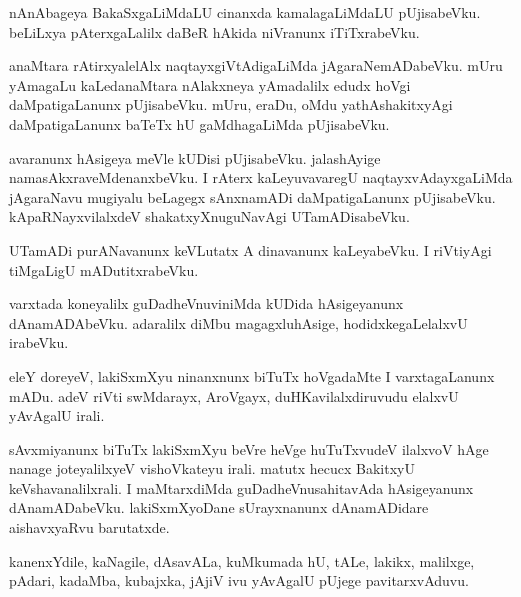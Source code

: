 \documentclass{article}
\begin{document}
\begin{mn}
nAnAbageya  BakaSxgaLiMdaLU  cinanxda  kamalagaLiMdaLU  pUjisabeVku.  beLiLxya  pAterxgaLalilx  
daBeR  hAkida  niVranunx  iTiTxrabeVku.
\end{mn}

\begin{mn}
anaMtara  rAtirxyalelAlx  naqtayxgiVtAdigaLiMda  jAgaraNemADabeVku.  mUru  yAmagaLu  
kaLedanaMtara  nAlakxneya  yAmadalilx  edudx  hoVgi  daMpatigaLanunx  pUjisabeVku.  
mUru,  eraDu,  oMdu  yathAshakitxyAgi  daMpatigaLanunx  baTeTx  hU  gaMdhagaLiMda  pUjisabeVku.
\end{mn}

\begin{mn}
avaranunx  hAsigeya  meVle  kUDisi  pUjisabeVku.  jalashAyige  namasAkxraveMdenanxbeVku.  
I  rAterx  kaLeyuvavaregU  naqtayxvAdayxgaLiMda  jAgaraNavu  mugiyalu  beLagegx  sAnxnamADi  
daMpatigaLanunx  pUjisabeVku.  kApaRNayxvilalxdeV  shakatxyXnuguNavAgi  UTamADisabeVku.
\end{mn}

\begin{mn}
UTamADi  purANavanunx  keVLutatx  A  dinavanunx  kaLeyabeVku.  I  riVtiyAgi  tiMgaLigU  mADutitxrabeVku.
\end{mn}

\begin{mn}
varxtada  koneyalilx  guDadheVnuviniMda  kUDida  hAsigeyanunx  dAnamADAbeVku.  
adaralilx  diMbu  magagxluhAsige,  hodidxkegaLelalxvU  irabeVku.
\end{mn}

\begin{mn}
eleY  doreyeV,  lakiSxmXyu  ninanxnunx  biTuTx hoVgadaMte  I  varxtagaLanunx  mADu.  
adeV  riVti  swMdarayx,  AroVgayx,  duHKavilalxdiruvudu  elalxvU  yAvAgalU  irali.
\end{mn}

\begin{mn}
sAvxmiyanunx  biTuTx  lakiSxmXyu  beVre  heVge  huTuTxvudeV  ilalxvoV  hAge  nanage  
joteyalilxyeV  vishoVkateyu  irali.  matutx  hecucx  BakitxyU  keVshavanalilxrali.  I  
maMtarxdiMda  guDadheVnusahitavAda  hAsigeyanunx  dAnamADabeVku.  lakiSxmXyoDane  
sUrayxnanunx  dAnamADidare  aishavxyaRvu  barutatxde.
\end{mn}

\begin{mn}
kanenxYdile,  kaNagile,  dAsavALa,  kuMkumada  hU,  tALe,  lakikx,  malilxge,  
pAdari,  kadaMba,  kubajxka,  jAjiV  ivu  yAvAgalU  pUjege  pavitarxvAduvu.
\end{mn}
\end{document}
